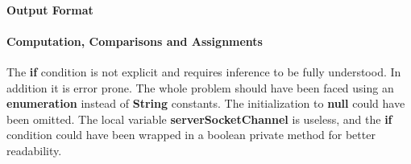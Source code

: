 
\paragraph{Output Format}
\begin{itemize}
\end{itemize}

\paragraph{Computation, Comparisons and Assignments}
\begin{itemize}
		\begin{itemize}
				The \textbf{if} condition is not explicit and requires inference to be fully understood.
				In addition it is error prone.
				The whole problem should have been faced using an \textbf{enumeration} instead of \textbf{String} constants.
				The initialization to \textbf{null} could have been omitted.
				The local variable \textbf{serverSocketChannel} is useless, and the \textbf{if} condition could have been wrapped in a boolean private method for better readability.
		\end{itemize}
\end{itemize}



